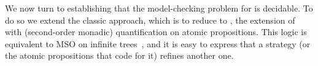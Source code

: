 

We now turn to establishing that the model-checking problem for \SLref
is decidable. To do so we extend the classic approach, which is to
reduce to \QCTLs, the extension of \CTLs with (second-order monadic) quantification on atomic
propositions. This logic is equivalent to MSO on infinite
trees~\cite{DBLP:journals/corr/LaroussinieM14}, and it is  easy to
express that a strategy (or the atomic propositions that code for it)
refines another one.



